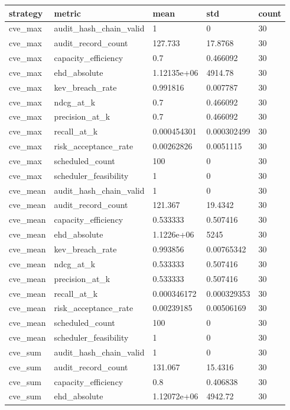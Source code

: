 \begin{tabular}{l l l l l}
\hline
strategy & metric & mean & std & count \\
\hline
cve\_max & audit\_hash\_chain\_valid & 1 & 0 & 30 \\
cve\_max & audit\_record\_count & 127.733 & 17.8768 & 30 \\
cve\_max & capacity\_efficiency & 0.7 & 0.466092 & 30 \\
cve\_max & ehd\_absolute & 1.12135e+06 & 4914.78 & 30 \\
cve\_max & kev\_breach\_rate & 0.991816 & 0.007787 & 30 \\
cve\_max & ndcg\_at\_k & 0.7 & 0.466092 & 30 \\
cve\_max & precision\_at\_k & 0.7 & 0.466092 & 30 \\
cve\_max & recall\_at\_k & 0.000454301 & 0.000302499 & 30 \\
cve\_max & risk\_acceptance\_rate & 0.00262826 & 0.0051115 & 30 \\
cve\_max & scheduled\_count & 100 & 0 & 30 \\
cve\_max & scheduler\_feasibility & 1 & 0 & 30 \\
cve\_mean & audit\_hash\_chain\_valid & 1 & 0 & 30 \\
cve\_mean & audit\_record\_count & 121.367 & 19.4342 & 30 \\
cve\_mean & capacity\_efficiency & 0.533333 & 0.507416 & 30 \\
cve\_mean & ehd\_absolute & 1.1226e+06 & 5245 & 30 \\
cve\_mean & kev\_breach\_rate & 0.993856 & 0.00765342 & 30 \\
cve\_mean & ndcg\_at\_k & 0.533333 & 0.507416 & 30 \\
cve\_mean & precision\_at\_k & 0.533333 & 0.507416 & 30 \\
cve\_mean & recall\_at\_k & 0.000346172 & 0.000329353 & 30 \\
cve\_mean & risk\_acceptance\_rate & 0.00239185 & 0.00506169 & 30 \\
cve\_mean & scheduled\_count & 100 & 0 & 30 \\
cve\_mean & scheduler\_feasibility & 1 & 0 & 30 \\
cve\_sum & audit\_hash\_chain\_valid & 1 & 0 & 30 \\
cve\_sum & audit\_record\_count & 131.067 & 15.4316 & 30 \\
cve\_sum & capacity\_efficiency & 0.8 & 0.406838 & 30 \\
cve\_sum & ehd\_absolute & 1.12072e+06 & 4942.72 & 30 \\

\end{tabular}
